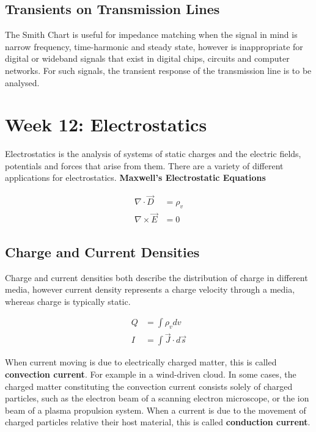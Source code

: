 \documentclass{book}
\begin{document}
\subsection{Transients on Transmission Lines}

The Smith Chart is useful for impedance matching when the signal in mind is narrow frequency, time-harmonic and steady state, however is inappropriate for digital or wideband signals that exist in digital chips, circuits and computer networks. For such signals, the transient response of the transmission line is to be analysed.
\section{Week 12: Electrostatics}

Electrostatics is the analysis of systems of static charges and the electric fields, potentials and forces that arise from them. There are a variety of different applications for electrostatics. \newline
\textbf{Maxwell's Electrostatic Equations}

\begin{align*}
	\nabla \cdot \vec{D} &= \rho_v \\
	\nabla \times \vec{E} &= 0
\end{align*}

\subsection{Charge and Current Densities}
Charge and current densities both describe the distribution of charge in different media, however current density represents a charge velocity through a media, whereas charge is typically static.

\begin{align*}
	Q &= \int \rho_v dv \\
	I &= \int \vec{J} \cdot d\vec{s}
\end{align*}

When current moving is due to electrically charged matter, this is called \textbf{convection current}. For example in a wind-driven cloud. In some cases, the charged matter constituting the convection current consists solely of charged particles, such as the electron beam of a scanning electron microscope, or the ion beam of a plasma propulsion system. When a current is due to the movement of charged particles relative their host material, this is called \textbf{conduction current}.
\end{document}
